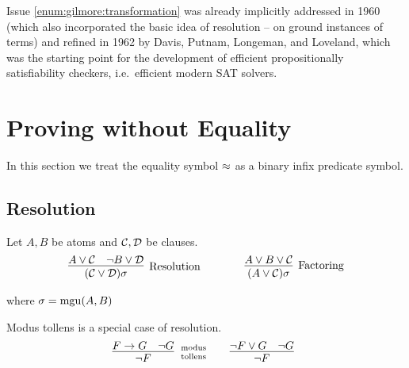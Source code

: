 Issue \ref{enum:gilmore:transformation} was already implicitly 
addressed in 1960 \cite{Davis:1960:CPQ:321033.321034}
(which also incorporated the basic idea of resolution -- on ground instances of terms)
and refined in 1962 \cite{Davis:1962:MPT:368273.368557}
by Davis, Putnam, Longeman, and Loveland, 
which was the starting point for the development of efficient propositionally satisfiability checkers, i.e.~efficient modern SAT solvers.


\section{Proving without Equality}

In this section we treat the equality symbol $\approx$ as a binary infix predicate symbol. 

\subsection{Resolution}

\begin{definition}\label{def:resolution} Let $A, B$ be atoms and ${\mathcal C},{\mathcal D}$ be clauses.
	\begin{gather*}
	\infer
	[\text{Resolution}] 
	{(\mcC\lor\mcD)\sigma}
	{A\lor\mcC&\lnot B\lor\mcD}
	\qquad\qquad
	\infer
	[\text{Factoring}] 
	{(A\lor\mcC)\sigma}
	{A\lor B\lor\mcC}
	\end{gather*}
	\begin{center}
		where
		$\sigma=\operatorname{mgu}(A,B)$
	\end{center}
\end{definition}

\begin{example}Modus tollens is a special case of resolution.
	\begin{gather*}
	\infer[\text{modus}\atop\text{tollens}]{\lnot F}{F\limp G & \lnot G}
	\qquad
	\infer[]{\lnot F}{\lnot F\lor G & \lnot G}
	\end{gather*}
\end{example}


